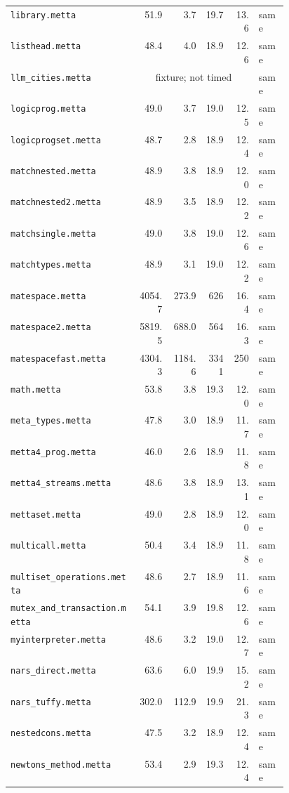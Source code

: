 \begin{longtable}{@{}p{0.46\linewidth}rrrrl@{}}
\nolinkurl{library.metta} & 51.9 & 3.7 & 19.7 & 13.6 & same \\
\nolinkurl{listhead.metta} & 48.4 & 4.0 & 18.9 & 12.6 & same \\
\nolinkurl{llm_cities.metta} & \multicolumn{4}{c}{fixture; not timed} & same \\
\nolinkurl{logicprog.metta} & 49.0 & 3.7 & 19.0 & 12.5 & same \\
\nolinkurl{logicprogset.metta} & 48.7 & 2.8 & 18.9 & 12.4 & same \\
\nolinkurl{matchnested.metta} & 48.9 & 3.8 & 18.9 & 12.0 & same \\
\nolinkurl{matchnested2.metta} & 48.9 & 3.5 & 18.9 & 12.2 & same \\
\nolinkurl{matchsingle.metta} & 49.0 & 3.8 & 19.0 & 12.6 & same \\
\nolinkurl{matchtypes.metta} & 48.9 & 3.1 & 19.0 & 12.2 & same \\
\nolinkurl{matespace.metta} & 4054.7 & 273.9 & 626 & 16.4 & same \\
\nolinkurl{matespace2.metta} & 5819.5 & 688.0 & 564 & 16.3 & same \\
\nolinkurl{matespacefast.metta} & 4304.3 & 1184.6 & 3341 & 250 & same \\
\nolinkurl{math.metta} & 53.8 & 3.8 & 19.3 & 12.0 & same \\
\nolinkurl{meta_types.metta} & 47.8 & 3.0 & 18.9 & 11.7 & same \\
\nolinkurl{metta4_prog.metta} & 46.0 & 2.6 & 18.9 & 11.8 & same \\
\nolinkurl{metta4_streams.metta} & 48.6 & 3.8 & 18.9 & 13.1 & same \\
\nolinkurl{mettaset.metta} & 49.0 & 2.8 & 18.9 & 12.0 & same \\
\nolinkurl{multicall.metta} & 50.4 & 3.4 & 18.9 & 11.8 & same \\
\nolinkurl{multiset_operations.metta} & 48.6 & 2.7 & 18.9 & 11.6 & same \\
\nolinkurl{mutex_and_transaction.metta} & 54.1 & 3.9 & 19.8 & 12.6 & same \\
\nolinkurl{myinterpreter.metta} & 48.6 & 3.2 & 19.0 & 12.7 & same \\
\nolinkurl{nars_direct.metta} & 63.6 & 6.0 & 19.9 & 15.2 & same \\
\nolinkurl{nars_tuffy.metta} & 302.0 & 112.9 & 19.9 & 21.3 & same \\
\nolinkurl{nestedcons.metta} & 47.5 & 3.2 & 18.9 & 12.4 & same \\
\nolinkurl{newtons_method.metta} & 53.4 & 2.9 & 19.3 & 12.4 & same \\

\end{longtable}
